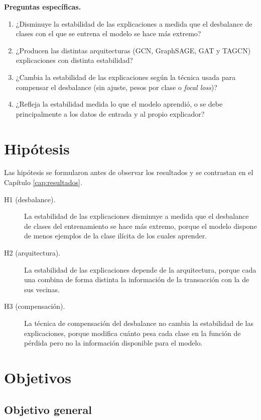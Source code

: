 \textbf{Preguntas específicas.}
\begin{enumerate}
  \item ¿Disminuye la estabilidad de las explicaciones a medida que el desbalance de clases
        con el que se entrena el modelo se hace más extremo?
  \item ¿Producen las distintas arquitecturas (GCN, GraphSAGE, GAT y TAGCN) explicaciones con
        distinta estabilidad?
  \item ¿Cambia la estabilidad de las explicaciones según la técnica usada para compensar el
        desbalance (sin ajuste, pesos por clase o \textit{focal loss})?
  \item ¿Refleja la estabilidad medida lo que el modelo aprendió, o se debe principalmente a
        los datos de entrada y al propio explicador?
\end{enumerate}

\section{Hipótesis}\label{sec:hipotesis}

Las hipótesis se formularon antes de observar los resultados y se contrastan en el Capítulo
\ref{cap:resultados}.

\begin{description}
  \item[H1 (desbalance).] La estabilidad de las explicaciones disminuye a medida que el
        desbalance de clases del entrenamiento se hace más extremo, porque el modelo dispone de
        menos ejemplos de la clase ilícita de los cuales aprender.
  \item[H2 (arquitectura).] La estabilidad de las explicaciones depende de la arquitectura,
        porque cada una combina de forma distinta la información de la transacción con la de
        sus vecinas.
  \item[H3 (compensación).] La técnica de compensación del desbalance no cambia la
        estabilidad de las explicaciones, porque modifica cuánto pesa cada clase en la
        función de pérdida pero no la información disponible para el modelo.
\end{description}

\section{Objetivos}

\subsection{Objetivo general}

